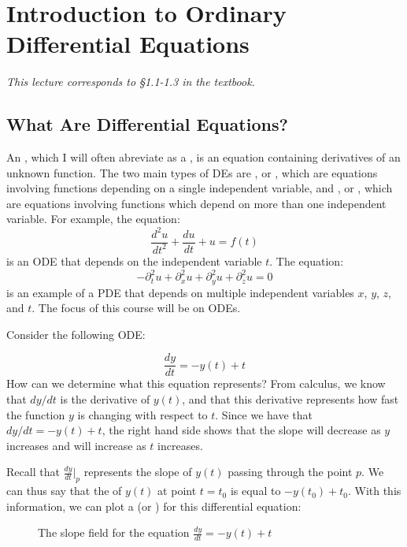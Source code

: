 \section{Introduction to Ordinary Differential Equations}

\textit{This lecture corresponds to \S1.1-1.3 in the textbook.}

\subsection{What Are Differential Equations?}

An , which I will often abreviate as a , is an equation containing derivatives of an unknown function. The two main types of DEs are , or , which are equations involving functions depending on a single independent variable, and , or , which are equations involving functions which depend on more than one independent variable. For example, the equation:
\[ \frac{d^2u}{dt^2} + \frac{du}{dt} + u = f(t) \]
is an ODE that depends on the independent variable $t$. The equation:
\[ -\partial_t^2u + \partial_x^2u + \partial_y^2u + \partial_z^2u = 0 \]
is an example of a PDE that depends on multiple independent variables $x$, $y$, $z$, and $t$. The focus of this course will be on ODEs.


\begin{example}
    Consider the following ODE:
\end{example}
    \[ \frac{dy}{dt} = -y(t) + t \]
    How can we determine what this equation represents? From calculus, we know that $dy/dt$ is the derivative of $y(t)$, and that this derivative represents how fast the function $y$ is changing with respect to $t$. Since we have that $dy/dt = -y(t) + t$, the right hand side shows that the slope will decrease as $y$ increases and will increase as $t$ increases.

    Recall that $\frac{dy}{dt}\big|_p$ represents the slope of $y(t)$ passing through the point $p$. We can thus say that the  of $y(t)$ at point $t = t_0$ is equal to $-y(t_0) + t_0$. With this information, we can plot a  (or ) for this differential equation:

    \begin{figure}[H]
        \centering 
         \caption{The slope field for the equation $\frac{dy}{dt} = -y(t) + t$}
     \end{figure}
  

